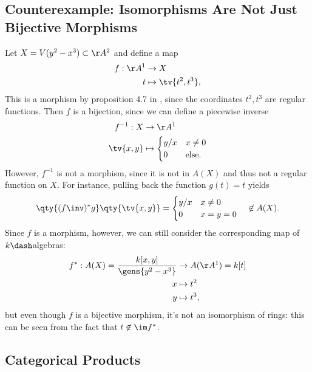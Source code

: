 \hypertarget{counterexample-isomorphisms-are-not-just-bijective-morphisms}{%
\subsection{Counterexample: Isomorphisms Are Not Just Bijective
Morphisms}\label{counterexample-isomorphisms-are-not-just-bijective-morphisms}}

\begin{warnings}

Let \(X = V(y^2 - x^3) \subset \AA^2\) and define a map
\begin{align*}  
f: \AA^1 &\to X \\
t &\mapsto \tv{t^2, t^3}
,\end{align*} This is a morphism by proposition 4.7 in
\autocite{AndreasGathmann515}, since the coordinates \(t^2, t^3\) are
regular functions. Then \(f\) is a bijection, since we can define a
piecewise inverse
\begin{align*}  
f^{-1}: X &\to \AA^1 \\
\tv{x, y} &\mapsto 
\begin{cases}
y/x & x\neq 0 \\
0 & \text{else}.
\end{cases}
\end{align*} However, \(f^{-1}\) is not a morphism, since it is not in
\(A(X)\) and thus not a regular function on \(X\). For instance, pulling
back the function \(g(t) = t\) yields
\begin{align*}  
\qty{ (f\inv)^* g} \qty{ \tv{x, y} } = 
\begin{cases}
y/x & x\neq 0\\
0 & x=y=0
\end{cases}
\quad 
\not \in A(X)
.\end{align*} Since \(f\) is a morphism, however, we can still consider
the corresponding map of \(k\dash\)algebras:
\begin{align*}  
f^*: A(X) = \frac{k[x, y]}{\gens{y^2 - x^3}} &\to A(\AA^1) = k[t] \\
x & \mapsto t^2 \\
y & \mapsto t^3
,\end{align*} but even though \(f\) is a bijective morphism, it's not an
isomorphism of rings: this can be seen from the fact that
\(t\not \in \im f^*\).

\end{warnings}

\hypertarget{categorical-products}{%
\subsection{Categorical Products}\label{categorical-products}}

